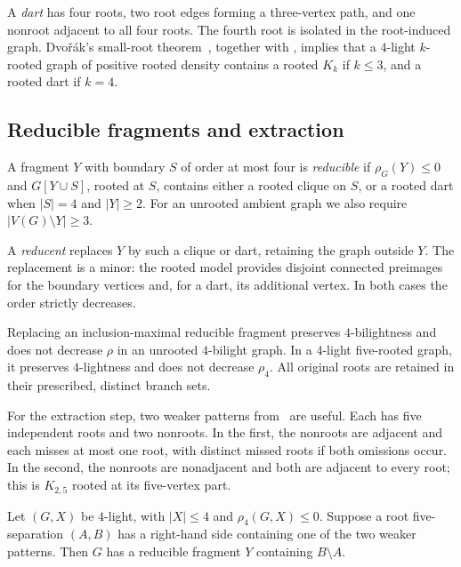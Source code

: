 A \emph{dart} has four roots, two root edges forming a three-vertex
path, and one nonroot adjacent to all four roots. The fourth root
is isolated in the root-induced graph. Dvo\v r\'ak's small-root
theorem~\cite[Corollary~13]{Dvorak2026}, together with
\cite[Lemma~3.1]{DNR2026}, implies that a $4$-light
$k$-rooted graph of positive rooted density contains a rooted $K_k$
if $k\leq3$, and a rooted dart if $k=4$.

\subsection{Reducible fragments and extraction}
A fragment $Y$ with boundary $S$ of order at most four is
\emph{reducible} if $\rho_G(Y)\leq0$ and $G[Y\cup S]$, rooted
at $S$, contains either a rooted clique on $S$, or a rooted dart
when $|S|=4$ and $|Y|\geq2$. For an unrooted ambient graph we
also require $|V(G)\setminus Y|\geq3$.

A \emph{reducent} replaces $Y$ by such a clique or dart, retaining
the graph outside $Y$. The replacement is a minor: the rooted model
provides disjoint connected preimages for the boundary vertices and,
for a dart, its additional vertex. In both cases the order strictly decreases.

\begin{lemma}\label{lem:reduction}
Replacing an inclusion-maximal reducible fragment preserves
$4$-bilightness and does not decrease $\rho$ in an unrooted
$4$-bilight graph. In a $4$-light five-rooted graph, it preserves
$4$-lightness and does not decrease $\rho_4$. All original roots
are retained in their prescribed, distinct branch sets.
\end{lemma}

For the extraction step, two weaker patterns from~\cite{DNR2026}
are useful. Each has five independent roots and two nonroots.
In the first, the nonroots are adjacent and each misses at most
one root, with distinct missed roots if both omissions occur.
In the second, the nonroots are nonadjacent and both are adjacent to every
root; this is $K_{2,5}$ rooted at its five-vertex part.

\begin{lemma}\label{lem:extraction}
Let $(G,X)$ be $4$-light, with $|X|\leq4$ and $\rho_4(G,X)\leq0$.
Suppose a root five-separation $(A,B)$ has a right-hand side containing
one of the two weaker patterns. Then $G$ has a reducible fragment
$Y$ containing $B\setminus A$.
\end{lemma}

